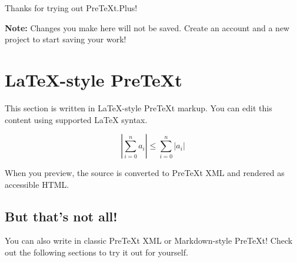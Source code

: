 Thanks for trying out PreTeXt.Plus!

\textbf{Note:} Changes you make here will not be saved. Create an account
and a new project to start saving your work!



\section{\LaTeX-style PreTeXt}\label{tryit-latex}

This section is written in \LaTeX-style PreTeXt markup. You can edit
this content using supported LaTeX syntax.

\[
    \left|\sum_{i=0}^n a_i\right|\leq\sum_{i=0}^n |a_i|
\]

When you preview, the source is converted to PreTeXt XML and rendered
as accessible HTML.


\subsection{But that's not all!}\label{tryit-more}

You can also write in classic PreTeXt XML or Markdown-style PreTeXt!
Check out the following sections to try it out for yourself.


